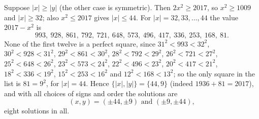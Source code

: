 Suppose $|x|\ge|y|$ (the other case is symmetric). Then $2x^2\ge2017$, so $x^2\ge1009$ and $|x|\ge32$; also $x^2\le2017$ gives $|x|\le44$. For $|x|=32,33,\dots,44$ the value $2017-x^2$ is
\[
993,\ 928,\ 861,\ 792,\ 721,\ 648,\ 573,\ 496,\ 417,\ 336,\ 253,\ 168,\ 81 .
\]
None of the first twelve is a perfect square, since $31^2<993<32^2$, $30^2<928<31^2$, $29^2<861<30^2$, $28^2<792<29^2$, $26^2<721<27^2$, $25^2<648<26^2$, $23^2<573<24^2$, $22^2<496<23^2$, $20^2<417<21^2$, $18^2<336<19^2$, $15^2<253<16^2$ and $12^2<168<13^2$; so the only square in the list is $81=9^2$, for $|x|=44$. Hence $\{|x|,|y|\}=\{44,9\}$ (indeed $1936+81=2017$), and with all choices of signs and order the solutions are
\[
\boxed{(x,y)=(\pm44,\pm9)\text{ and }(\pm9,\pm44)},
\]
eight solutions in all.

